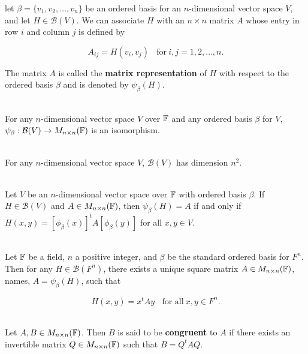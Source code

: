 \begin{definition}
	let $\beta = \{v_1, v_2, \dots, v_n\}$ be an ordered basis for an $n$-dimensional vector space $V$, and let $H \in \mathcal{B}(V)$. We can associate $H$ with an $n \times n$ matrix $A$ whose entry in row $i$ and column $j$ is defined by

	\[A_{ij} = H(v_i, v_j)\ \ \ \ \text{for}\ i,j = 1, 2, \dots, n.\]

	The matrix $A$ is called the \textbf{matrix representation} of $H$ with respect to the ordered basis $\beta$ and is denoted by $\psi_\beta(H)$.
\end{definition}

\begin{theorem}
	\hfill\\
	For any $n$-dimensional vector space $V$ over $\mathbb{F}$ and any ordered basis $\beta$ for $V$, $\psi_\beta : \mathcal{B}(V) \to M_{n \times n}(\mathbb{F})$ is an isomorphism.
\end{theorem}

\begin{corollary}
	\hfill\\
	For any $n$-dimensional vector space $V$, $\mathcal{B}(V)$ has dimension $n^2$.
\end{corollary}

\begin{corollary}
	\hfill\\
	Let $V$ be an $n$-dimensional vector space over $\mathbb{F}$ with ordered basis $\beta$. If $H \in \mathcal{B}(V)$ and $A \in M_{n \times n}(\mathbb{F})$, then $\psi_\beta(H) = A$ if and only if $H(x,y) = [\phi_\beta(x)]^tA[\phi_\beta(y)]$ for all $x,y \in V$.
\end{corollary}

\begin{corollary}
	\hfill\\
	Let $\mathbb{F}$ be a field, $n$ a positive integer, and $\beta$ be the standard ordered basis for $F^n$. Then for any $H \in \mathcal{B}(F^n)$, there exists a unique square matrix $A \in M_{n \times n}(\mathbb{F})$, names, $A = \psi_\beta(H)$, such that

	\[H(x,y) = x^tAy\ \ \ \ \text{for all}\ x,y \in F^n.\]
\end{corollary}

\begin{definition}
	\hfill\\
	Let $A,B \in M_{n \times n}(\mathbb{F})$. Then $B$ is said to be \textbf{congruent} to $A$ if there exists an invertible matrix $Q \in M_{n \times n}(\mathbb{F})$ such that $B = Q^tAQ$.
\end{definition}

